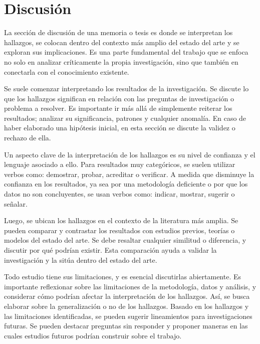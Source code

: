 \section{Discusión}

La sección de discusión de una memoria o tesis es donde se interpretan los hallazgos, se colocan dentro del contexto más amplio del estado del arte y se exploran sus implicaciones. Es una parte fundamental del trabajo que se enfoca no solo en analizar críticamente la propia investigación, sino que también en conectarla con el conocimiento existente.

Se suele comenzar interpretando los resultados de la investigación. Se discute lo que los hallazgos significan en relación con las preguntas de investigación o problema a resolver. Es importante ir más allá de simplemente reiterar los resultados; analizar su significancia, patrones y cualquier anomalía. En caso de haber elaborado una hipótesis inicial, en esta sección se discute la validez o rechazo de ella.

Un aspecto clave de la interpretación de los hallazgos es su nivel de confianza y el lenguaje asociado a ello. Para resultados muy categóricos, se suelen utilizar verbos como: demostrar, probar, acreditar o verificar. A medida que disminuye la confianza en los resultados, ya sea por una metodología deficiente o por que los datos no son concluyentes, se usan verbos como: indicar, mostrar, sugerir o señalar.

Luego, se ubican los hallazgos en el contexto de la literatura más amplia. Se pueden comparar y contrastar los resultados con estudios previos, teorías o modelos del estado del arte. Se debe resaltar cualquier similitud o diferencia, y discutir por qué podrían existir. Esta comparación ayuda a validar la investigación y la sitúa dentro del estado del arte.

Todo estudio tiene sus limitaciones, y es esencial discutirlas abiertamente. Es importante reflexionar sobre las limitaciones de la metodología, datos y análisis, y considerar cómo podrían afectar la interpretación de los hallazgos. Así, se busca elaborar sobre la generalización o no de los hallazgos. Basado en los hallazgos y las limitaciones identificadas, se pueden sugerir lineamientos para investigaciones futuras. Se pueden destacar preguntas sin responder y proponer maneras en las cuales estudios futuros podrían construir sobre el trabajo.

